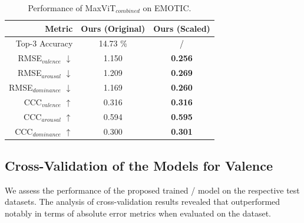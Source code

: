 \begin{table}[htbp]
\centering
\begin{tabular}{r | c | c}
\hline
\textbf{Metric} & \textbf{Ours} (Original) & \textbf{Ours} (Scaled) \\
\hline
Top-3 Accuracy & 14.73 \% & / \\ 
RMSE$_{valence}$ $\downarrow$& 1.150 & \textbf{0.256} \\ 
RMSE$_{arousal}$ $\downarrow$& 1.209 & \textbf{0.269}\\ 
RMSE$_{dominance}$ $\downarrow$& 1.169 & \textbf{0.260} \\ 
CCC$_{valence}$ $\uparrow$& 0.316 & \textbf{0.316} \\ 
CCC$_{arousal}$ $\uparrow$& 0.594 & \textbf{0.595} \\
CCC$_{dominance}$ $\uparrow$& 0.300 & \textbf{0.301}\\ \hline
\end{tabular}
\caption{Performance of MaxViT$_{combined}$ on EMOTIC.}
\label{tab:benchmarkourapproachemotic}
\end{table}

\subsection{Cross-Validation of the Models for Valence }

We assess the performance of the proposed trained \affectnet{}/\emotic{} model on the respective test datasets. The analysis of cross-validation results revealed that \affectnet{} outperformed \emotic{} notably in terms of absolute error metrics when evaluated on the \affectnet{} dataset. 



